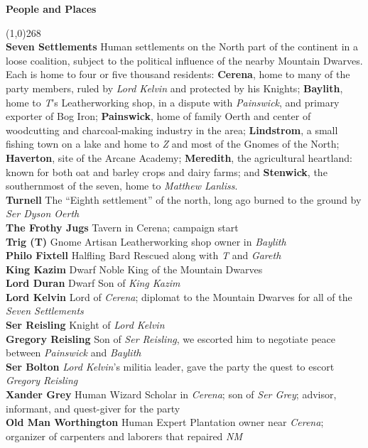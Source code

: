 \documentclass[letterpaper]{article}
\newcommand{\colline}{\line(1,0){268} \\}
\newcommand{\e}[1]{\emph{#1}}
\newcommand{\B}[1]{\textbf{#1}}
\newenvironment{notesection}[1]
{ {\huge \B{#1}} \par
\vspace{-0.75em}
\colline
\begingroup\fontsize{9pt}{12pt}\selectfont}
{\endgroup}
\newcommand{\person}[3]{\B{#1
    \ifstrequal{#2}{M}{{\color{ProcessBlue}\male}}{%
    \ifstrequal{#2}{F}{\color{VioletRed}\female}{}}}{\scriptsize #3}}
\begin{document}
\twocolumn
\begin{notesection}{People and Places}
\B{Seven Settlements} Human settlements on the North part of the continent in a loose coalition, subject to the political influence of the nearby Mountain Dwarves. Each is home to four or five thousand residents: \B{Cerena}, home to many of the party members, ruled by \e{Lord Kelvin} and protected by his Knights; \B{Baylith}, home to \e{T}'s Leatherworking shop, in a dispute with \e{Painswick}, and primary exporter of Bog Iron; \B{Painswick}, home of family Oerth and center of woodcutting and charcoal-making industry in the area; \B{Lindstrom}, a small fishing town on a lake and home to \e{Z} and most of the Gnomes of the North; \B{Haverton}, site of the Arcane Academy; \B{Meredith}, the agricultural heartland: known for both oat and barley crops and dairy farms; and \B{Stenwick}, the southernmost of the seven, home to \e{Matthew Lanliss}.\\
\B{Turnell} The ``Eighth settlement'' of the north, long ago burned to the ground by \e{Ser Dyson Oerth} \\
\B{The Frothy Jugs} Tavern in Cerena; campaign start\\
\person{Trig (T)}{F}{Gnome Artisan} Leatherworking shop owner in \e{Baylith} \\
\person{Philo Fixtell}{M}{Halfling Bard} Rescued along with \e{T} and \e{Gareth}\\
\person{King Kazim}{M}{Dwarf Noble} King of the Mountain Dwarves\\
\person{Lord Duran}{M}{Dwarf} Son of \e{King Kazim}\\
\person{Lord Kelvin}{M}{} Lord of \e{Cerena}; diplomat to the Mountain Dwarves for all of the \e{Seven Settlements}\\
\person{Ser Reisling}{M}{} Knight of \e{Lord Kelvin}\\
\person{Gregory Reisling}{M}{} Son of \e{Ser Reisling}, we escorted him to negotiate peace between \e{Painswick} and \e{Baylith}\\
\person{Ser Bolton}{M}{} \e{Lord Kelvin}'s militia leader, gave the party the quest to escort \e{Gregory Reisling} \\
\person{Xander Grey}{M}{Human Wizard} Scholar in \e{Cerena}; son of \e{Ser Grey}; advisor, informant, and quest-giver for the party\\
\person{Old Man Worthington}{M}{Human Expert} Plantation owner near \e{Cerena}; organizer of carpenters and laborers that repaired \e{NM}\\

\end{notesection}
\end{document}
